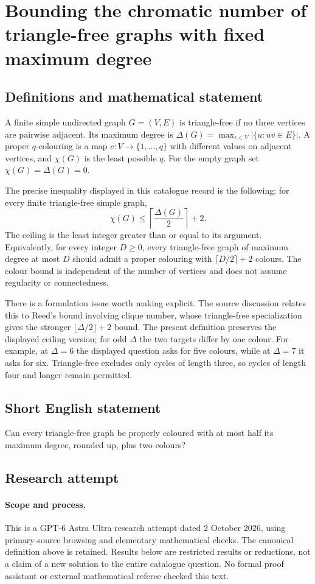 \documentclass[11pt,a4paper]{article}
\begin{document}
\section*{Bounding the chromatic number of triangle-free graphs with fixed maximum degree}\label{statement}

\subsection{Definitions and mathematical statement}
A finite simple undirected graph $G=(V,E)$ is triangle-free if no three
vertices are pairwise adjacent. Its maximum degree is
$\Delta(G)=\max_{v\in V}|\{u:uv\in E\}|$. A proper $q$-colouring is a map
$c:V\to\{1,\ldots,q\}$ with different values on adjacent vertices, and
$\chi(G)$ is the least possible $q$. For the empty graph set
$\chi(G)=\Delta(G)=0$.

The precise inequality displayed in this catalogue record is the following:
for every finite triangle-free simple graph,
\[
                \chi(G)\le\left\lceil\frac{\Delta(G)}2\right\rceil+2.
\]
The ceiling is the least integer greater than or equal to its argument.
Equivalently, for every integer $D\ge0$, every triangle-free graph of
maximum degree at most $D$ should admit a proper colouring with
$\lceil D/2\rceil+2$ colours. The colour bound is independent of the number
of vertices and does not assume regularity or connectedness.

There is a formulation issue worth making explicit. The source discussion
relates this to Reed's bound involving clique number, whose triangle-free
specialization gives the stronger $\lfloor\Delta/2\rfloor+2$ bound. The
present definition preserves the displayed ceiling version; for odd
$\Delta$ the two targets differ by one colour. For example, at $\Delta=6$
the displayed question asks for five colours, while at $\Delta=7$ it asks
for six. Triangle-free excludes only cycles of length three, so cycles of
length four and longer remain permitted.
\subsection{Short English statement}
Can every triangle-free graph be properly coloured with at most half its maximum degree, rounded up, plus two colours?
\subsection{Research attempt}
\paragraph{Scope and process.}
This is a GPT-6 Astra Ultra research attempt dated 2 October 2026, using
primary-source browsing and elementary mathematical checks. The canonical
definition above is retained. Results below are restricted results or
reductions, not a claim of a new solution to the entire catalogue question.
No formal proof assistant or external mathematical referee checked this text.
\end{document}
